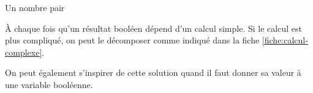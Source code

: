 \begin{Fiche}{Un nombre pair}



	

	À chaque fois qu’un résultat booléen dépend d’un calcul simple.
	Si le calcul est plus compliqué, on peut le décomposer comme
	indiqué dans la fiche \vref{fiche:calcul-complexe}.
	
	On peut également s’inspirer de cette solution
	quand il faut donner sa valeur à une variable booléenne.
		
\end{Fiche}
